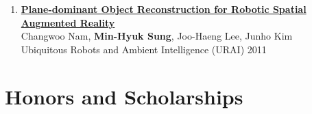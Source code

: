 \documentclass[letterpaper,10pt]{article} %
\newcommand{\blankline}{\quad\pagebreak[2]}
\begin{document}
{\begin{enumerate}
\item \label{urai11}
\href{http://dx.doi.org/10.1109/URAI.2011.6145896}{\textbf{Plane-dominant Object Reconstruction for Robotic Spatial Augmented Reality}} \\
Changwoo Nam, \textbf{Min-Hyuk Sung}, Joo-Haeng Lee, Junho Kim \\
Ubiquitous Robots and Ambient Intelligence (URAI) 2011 \\
\blankline

%

\end{enumerate}

\blankline



\section{Honors and Scholarships}

\begin{tabular}{r|p{11cm}}


\end{tabular}}
\end{document}
